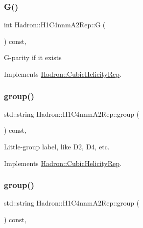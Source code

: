 \subsubsection{\texorpdfstring{G()}{G()}\hspace{0.1cm}{\footnotesize\ttfamily [3/3]}}
{\footnotesize\ttfamily int Hadron\+::\+H1\+C4nnm\+A2\+Rep\+::G (\begin{DoxyParamCaption}{ }\end{DoxyParamCaption}) const\hspace{0.3cm}{\ttfamily [inline]}, {\ttfamily [virtual]}}

G-\/parity if it exists 

Implements \mbox{\hyperlink{structHadron_1_1CubicHelicityRep_a50689f42be1e6170aa8cf6ad0597018b}{Hadron\+::\+Cubic\+Helicity\+Rep}}.

\mbox{\label{structHadron_1_1H1C4nnmA2Rep_a618b727c856720ba9e2828e3485f6733}} 
\subsubsection{\texorpdfstring{group()}{group()}\hspace{0.1cm}{\footnotesize\ttfamily [1/5]}}
{\footnotesize\ttfamily std\+::string Hadron\+::\+H1\+C4nnm\+A2\+Rep\+::group (\begin{DoxyParamCaption}{ }\end{DoxyParamCaption}) const\hspace{0.3cm}{\ttfamily [inline]}, {\ttfamily [virtual]}}

Little-\/group label, like D2, D4, etc. 

Implements \mbox{\hyperlink{structHadron_1_1CubicHelicityRep_a101a7d76cd8ccdad0f272db44b766113}{Hadron\+::\+Cubic\+Helicity\+Rep}}.

\mbox{\label{structHadron_1_1H1C4nnmA2Rep_a618b727c856720ba9e2828e3485f6733}} 
\subsubsection{\texorpdfstring{group()}{group()}\hspace{0.1cm}{\footnotesize\ttfamily [2/5]}}
{\footnotesize\ttfamily std\+::string Hadron\+::\+H1\+C4nnm\+A2\+Rep\+::group (\begin{DoxyParamCaption}{ }\end{DoxyParamCaption}) const\hspace{0.3cm}{\ttfamily [inline]}, {\ttfamily [virtual]}}

